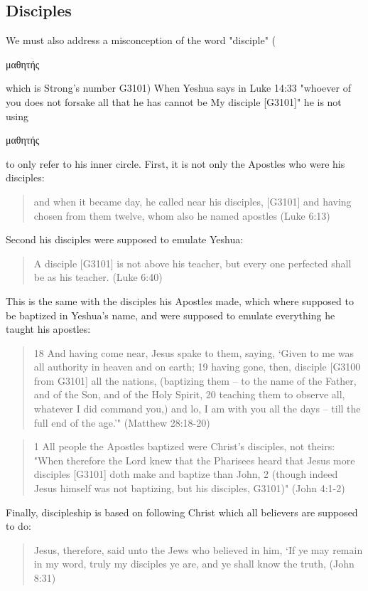 \documentclass[11pt]{article}
\begin{document}
\subsection{Disciples}
We must also address a misconception of the word "disciple" (\begin{greek}μαθητής\end{greek} which is Strong's number G3101) When Yeshua says in Luke 14:33 "whoever of you does not forsake all that he has cannot be My disciple [G3101]" he is not using \begin{greek}μαθητής\end{greek} to only refer to his inner circle. First, it is not only the Apostles who were his disciples: 
\begin{quote}
and when it became day, he called near his disciples, [G3101] and having chosen from them twelve, whom also he named apostles (Luke 6:13) 
\end{quote}
Second his disciples were supposed to emulate Yeshua: 
\begin{quote}
A disciple [G3101] is not above his teacher, but every one perfected shall be as his teacher. (Luke 6:40)
\end{quote}
This is the same with the disciples his Apostles made, which where supposed to be baptized in Yeshua's name, and were supposed to emulate everything he taught his apostles: 
\begin{quote}
18 And having come near, Jesus spake to them, saying, `Given to me was all authority in heaven and on earth;
19 having gone, then, disciple [G3100 from G3101] all the nations, (baptizing them -- to the name of the Father, and of the Son, and of the Holy Spirit,
20 teaching them to observe all, whatever I did command you,) and lo, I am with you all the days -- till the full end of the age.'" (Matthew 28:18-20) 
\end{quote}
\begin{quote}
1 All people the Apostles baptized were Christ's disciples, not theirs: "When therefore the Lord knew that the Pharisees heard that Jesus more disciples [G3101] doth make and baptize than John, 2 (though indeed Jesus himself was not baptizing, but his disciples, G3101)" (John 4:1-2) 
\end{quote}
Finally, discipleship is based on following Christ which all believers are supposed to do:
\begin{quote}
Jesus, therefore, said unto the Jews who believed in him, `If ye may remain in my word, truly my disciples ye are, and ye shall know the truth, (John 8:31) 
\end{quote}
\end{document}
